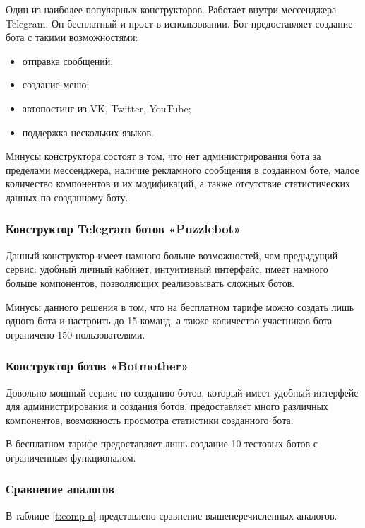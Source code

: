 Один из наиболее популярных конструкторов. Работает внутри мессенджера Telegram.
Он бесплатный и прост в использовании.
Бот предоставляет создание бота с такими возможностями:
\begin{itemize}
	\item отправка сообщений;
	\item создание меню;
	\item автопостинг из VK, Twitter, YouTube;
	\item поддержка нескольких языков.
\end{itemize}

Минусы конструктора состоят в том, что нет администрирования
бота за пределами мессенджера, наличие рекламного сообщения в
созданном боте, малое количество компонентов и их модификаций,
а также отсутствие статистических данных по созданному боту.

\subsubsection{Конструктор Telegram ботов «Puzzlebot»}


Данный конструктор имеет намного больше возможностей, чем предыдущий сервис:
удобный личный кабинет, интуитивный интерфейс, имеет намного больше компонентов,
позволяющих реализовывать сложных ботов.

Минусы данного решения в том, что на бесплатном тарифе
можно создать лишь одного бота и настроить до 15 команд, а также
количество участников бота ограничено 150 пользователями.

\subsubsection{Конструктор ботов «Botmother»}

Довольно мощный сервис по созданию ботов, который имеет удобный интерфейс
для администрирования и создания ботов, предоставляет много различных компонентов,
возможность просмотра статистики созданного бота.

В бесплатном тарифе предоставляет лишь создание 10 тестовых ботов с ограниченным
функционалом.

\subsubsection{Сравнение аналогов}

В таблице \ref{t:comp-a} представлено сравнение вышеперечисленных аналогов.

